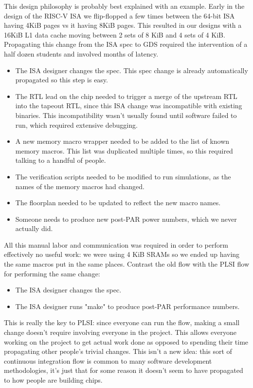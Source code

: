 \documentclass{article}
\begin{document}
This design philosophy is probably best explained with an example.  Early in
the design of the RISC-V ISA we flip-flopped a few times between the 64-bit ISA
having 4KiB pages vs it having 8KiB pages.  This resulted in our designs with a
16KiB L1 data cache moving between 2 sets of 8 KiB and 4 sets of 4 KiB.
Propagating this change from the ISA spec to GDS required the intervention of a
half dozen students and involved months of latency.

\begin{itemize}
\item The ISA designer changes the spec.  This spec change is already
automatically propagated so this step is easy.
\item The RTL lead on the chip needed to trigger a merge of the upstream RTL
into the tapeout RTL, since this ISA change was incompatible with existing
binaries.  This incompatibility wasn't usually found until software failed to
run, which required extensive debugging.
\item A new memory macro wrapper needed to be added to the list of known memory
macros.  This list was duplicated multiple times, so this required talking to a
handful of people.
\item The verification scripts needed to be modified to run simulations, as the
names of the memory macros had changed.
\item The floorplan needed to be updated to reflect the new macro names.
\item Someone needs to produce new post-PAR power numbers, which we never
actually did.
\end{itemize}

All this manual labor and communication was required in order to perform
effectively no useful work: we were using 4 KiB SRAMs so we ended up having the
same macros put in the same places.  Contrast the old flow with the PLSI flow
for performing the same change:

\begin{itemize}
\item The ISA designer changes the spec.
\item The ISA designer runs "make" to produce post-PAR performance numbers.
\end{itemize}

This is really the key to PLSI: since everyone can run the flow, making a small
change doesn't require involving everyone in the project.  This allows everyone
working on the project to get actual work done as opposed to spending their
time propagating other people's trivial changes.  This isn't a new idea: this
sort of continuous integration flow is common to many software development
methodologies, it's just that for some reason it doesn't seem to have
propagated to how people are building chips.
\end{document}
